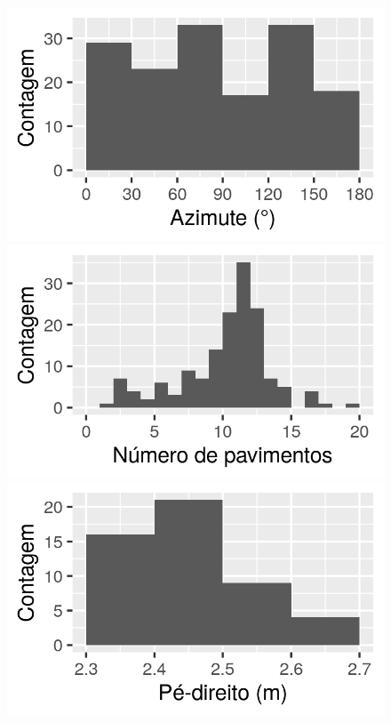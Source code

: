 \documentclass[brazil,hardcopy,openany]{ufscthesis} %
\begin{document}
\begin{figure}[H]
	\label{fig:db_hist}
	\centering
	\begin{minipage}{.33\textwidth}
		\centering
		\includegraphics[width=\linewidth]{img/hist_azimute.png}
	\end{minipage}%
	\begin{minipage}{.33\textwidth}
		\centering
		\includegraphics[width=\linewidth]{img/hist_numero_pavimentos.png}
	\end{minipage}%
	\begin{minipage}{.33\textwidth}
		\centering
		\includegraphics[width=\linewidth]{img/hist_pe_direito.png}

\end{minipage}
\end{figure}
\end{document}
